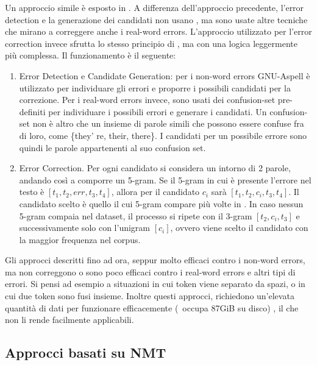 Un approccio simile è esposto in \cite{ocrG2}. A differenza dell'approccio precedente, l'error detection e la generazione dei candidati non usano \gw, ma sono usate altre tecniche che mirano a correggere anche i real-word errors. L'approccio utilizzato per l'error correction invece sfrutta lo stesso principio di \cite{ocrG1}, ma con una logica leggermente più complessa. Il funzionamento è il seguente:
\begin{enumerate}
\item Error Detection e Candidate Generation: per i non-word errors GNU-Aspell\cite{atkinsongnu} è utilizzato per individuare gli errori e proporre i possibili candidati per la correzione. Per i real-word errors invece, sono usati dei confusion-set pre-definiti per individuare i possibili errori e generare i candidati. Un confusion-set non  è altro che un insieme di parole simili che possono essere confuse fra di loro, come \{they'
re, their, there\}. I candidati per un possibile errore sono quindi le parole appartenenti al suo confusion set.

\item Error Correction. Per ogni candidato si considera un intorno di 2 parole, andando così a comporre un 5-gram. Se il 5-gram in cui è presente l'errore nel testo è $[t_1,t_2,\textit{err},t_3,t_4]$, allora per il candidato $c_i$ sarà $[t_1,t_2,c_i,t_3,t_4]$. Il candidato scelto è quello il cui 5-gram compare più volte in \gw. In caso nessun 5-gram compaia nel dataset, il processo si ripete con il 3-gram $[t_2,c_i,t_3]$ e successivamente solo con l'unigram $[c_i]$, ovvero viene scelto il candidato con la maggior frequenza nel corpus.
\end{enumerate}
Gli approcci descritti fino ad ora, seppur molto efficaci contro i non-word errors, ma non correggono o sono poco efficaci contro i real-word errors e altri tipi di errori. Si pensi ad esempio a situazioni in cui token viene separato da spazi, o in cui due token sono fusi insieme. Inoltre questi approcci, richiedono un'elevata quantità di dati per funzionare efficacemente (\gw\ occupa 87GiB su disco) , il che non li rende facilmente applicabili.


\subsection{Approcci basati su NMT}
